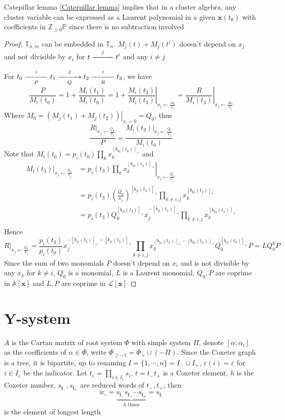 \documentclass[main]{subfiles}
\begin{document}
\begin{theorem}\label{Laurent phenonmenon}
Catepillar lemma \ref{Caterpillar lemma} implies that in a cluster algebra, any cluster variable can be expressed as a Laurent polynomial in a given $\mathbf x(t_0)$ with coefficients in $\mathbb Z_{\geq0}\mathbb P$ since there is no subtraction involved
\end{theorem}

\begin{proof}
$\mathbb T_{n,m}$ can be embedded in $\mathbb T_n$. $M_j(t)+M_j(t')$ doesn't depend on $x_j$ and not divisible by $x_i$ for $t\xedge jt'$ and any $i\neq j$ \par
For $t_0\xedge[P]{i}t_1\xdirectededge[Q]{j}t_2\xedge[R]{i}t_3$, we have
\[\frac{P}{M_i(t_0)}=1+\frac{M_i(t_1)}{M_i(t_0)}=1+\left.\frac{M_i(t_2)}{M_i(t_3)}\right|_{x_j\leftarrow\frac{M_0}{x_j}}=\left.\frac{R}{M_i(t_3)}\right|_{x_j\leftarrow\frac{M_0}{x_j}}\]
Where $M_0=\left.(M_j(t_1)+M_j(t_2))\right|_{x_i=0}=Q_0$, thus
\[\frac{R|_{x_j\leftarrow\frac{Q_0}{x_j}}}{P}=\frac{M_i(t_3)|_{x_j\leftarrow\frac{Q_0}{x_j}}}{M_i(t_0)}\]
Note that $\displaystyle M_i(t_0)=p_i(t_0)\prod_kx_k^{[b_{ki}(t_0)]_+}$ and
\begin{align*}
M_i(t_3)|_{x_j\leftarrow\frac{Q_0}{x_j}}&=p_i(t_3)\left.\prod_kx_k^{[b_{ki}(t_3)]_+}\right|_{x_j\leftarrow\frac{Q_0}{x_j}} \\
&=p_i(t_3)\left(\frac{Q_0}{x_j}\right)^{[b_{ji}(t_3)]_+}\prod_{k\neq i,j}x_k^{[b_{ki}(t_3)]_+} \\
&=p_i(t_3)Q_0^{[b_{ji}(t_3)]_+}x_j^{-[b_{ji}(t_3)]_+}\prod_{k\neq i,j}x_k^{[b_{ki}(t_3)]_+} \\
\end{align*}
Hence
\[R|_{x_j\leftarrow\frac{Q_0}{x_j}}=\frac{p_i(t_3)}{p_i(t_0)}x_j^{-[b_{ji}(t_3)]_+-[b_{ji}(t_0)]_+}\prod_{k\neq i,j}x_k^{[b_{ki}(t_3)]_+-[b_{ki}(t_0)]_+}Q_0^{[b_{ji}(t_3)]_+}P=LQ_0^bP\]
Since the sum of two monomials $P$ doesn't depend on $x_i$ and is not divisible by any $x_k$ for $k\neq i$, $Q_0$ is a monomial, $L$ is a Laurent monomial, $Q_0,P$ are coprime in $\mathbb A[\mathbf x]$ and $L,P$ are coprime in $\mathcal L[\mathbf x]$
\end{proof}



\section{Y-system}

$A$ is the Cartan matrix of root system $\Phi$ with simple system $\Pi$, denote $[\alpha:\alpha_i]$ as the coefficients of $\alpha\in\Phi$, write $\Phi_{\geq-1}=\Phi_+\cup(-\Pi)$. Since the Coxeter graph is a tree, it is bipartite, up to renaming $I=\{1,\cdots,n\}=I_-\sqcup I_+$, $\varepsilon(i)=\varepsilon$ for $i\in I_\varepsilon$ be the indicator. Let $t_\varepsilon=\displaystyle\prod_{i\in I_\varepsilon}s_i$, $t=t_-t_+$ is a Coxeter element, $h$ is the Coxeter number. $s_{\mathbf i_-},s_{\mathbf i_+}$ are reduced words of $t_-,t_+$, then
\[w_\circ=\underbrace{s_{\mathbf i_-}s_{\mathbf i_+}\cdots s_{\mathbf i_\pm}}_{h\text{ times}}=s_{\mathbf i_\circ}\]
is the element of longest length
\end{document}
